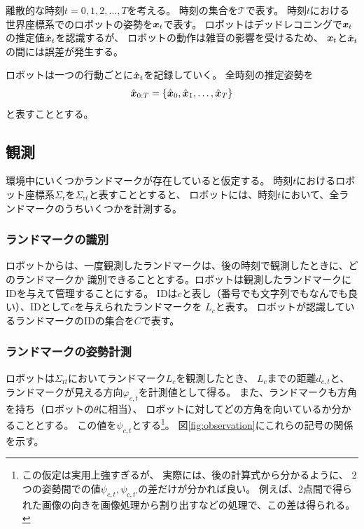 
離散的な時刻$t = 0,1,2,\dots,T$を考える。
時刻の集合を$\mathcal{T}$で表す。
時刻$t$における世界座標系でのロボットの姿勢を$\boldsymbol{x}_t$で表す。
ロボットはデッドレコニングで$\boldsymbol{x}_t$の推定値$\hat{\boldsymbol{x}}_t$を認識するが、
ロボットの動作は雑音の影響を受けるため、
$\boldsymbol{x}_t$と$\hat{\boldsymbol{x}}_t$の間には誤差が発生する。


ロボットは一つの行動ごとに$\hat{\boldsymbol{x}}_t$を記録していく。
全時刻の推定姿勢を
\begin{align}
\hat{\boldsymbol{x}}_{0:T} = \{\hat{\boldsymbol{x}}_0, \hat{\boldsymbol{x}}_1, \dots, \hat{\boldsymbol{x}}_T \}
\end{align}
と表すこととする。

\subsection{観測}

環境中にいくつかランドマークが存在していると仮定する。
時刻$t$におけるロボット座標系$\Sigma_\text{r}$を$\Sigma_{\text{r}t}$と表すこととすると、
ロボットには、時刻$t$において、全ランドマークのうちいくつかを計測する。

\subsubsection{ランドマークの識別}

ロボットからは、一度観測したランドマークは、後の時刻で観測したときに、どのランドマークか
識別できることとする。ロボットは観測したランドマークにIDを与えて管理することにする。
IDは$c$と表し（番号でも文字列でもなんでも良い）、IDとして$c$を与えられたランドマークを
$L_c$と表す。
ロボットが認識しているランドマークのIDの集合を$C$で表す。

\subsubsection{ランドマークの姿勢計測}

ロボットは$\Sigma_{\text{r}t}$においてランドマーク$L_c$を観測したとき、
$L_c$までの距離$d_{c,t}$と、ランドマークが見える方向$\varphi_{c,t}$を計測値として得る。
また、ランドマークも方角を持ち（ロボットの$\theta$に相当）、
ロボットに対してどの方角を向いているか分かることとする。
この値を$\psi_{c,t}$とする\footnote{この仮定は実用上強すぎるが、
実際には、後の計算式から分かるように、
2つの姿勢間での値$\psi_{c,t}, \psi_{c,t'}$の差だけが分かれば良い。
例えば、2点間で得られた画像の向きを画像処理から割り出すなどの処理で、この差は得られる。}。
図\ref{fig:observation}にこれらの記号の関係を示す。

